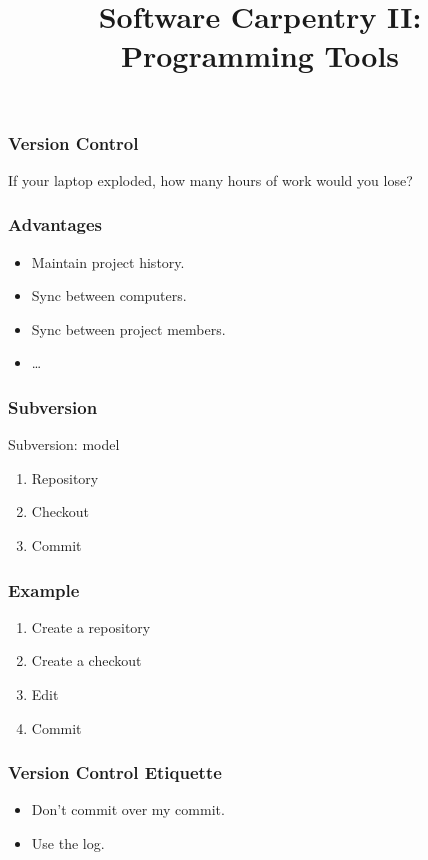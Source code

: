 
\title{Software Carpentry II: Programming Tools}

\frame{\maketitle}

\begin{frame}[fragile]
\frametitle{Version Control}

If your laptop exploded, how many hours of work would you lose?
\end{frame}

\begin{frame}[fragile]
\frametitle{Advantages}
\begin{itemize}
\item Maintain project history.
\item Sync between computers.
\item Sync between project members.
\item \ldots
\end{itemize}
\end{frame}

\begin{frame}[fragile]
\frametitle{Subversion}
\begin{block}{Subversion: model}
\begin{enumerate}
\item Repository
\item Checkout
\item Commit
\end{enumerate}
\end{block}
\end{frame}

\begin{frame}[fragile]
\frametitle{Example}
\begin{enumerate}
\item Create a repository
\item Create a checkout
\item Edit
\item Commit
\end{enumerate}
\end{frame}

\begin{frame}[fragile]
\frametitle{Version Control Etiquette}
\begin{itemize}
\item Don't commit over my commit.
\item Use the log.
\end{itemize}
\end{frame}


